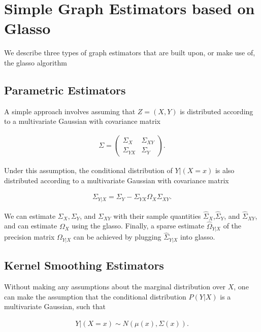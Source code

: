 \documentclass[12pt]{article}
\begin{document}
\section{Simple Graph Estimators based on Glasso}
\label{simpleEstimators}

We describe three types of graph estimators that are built upon, or
make use of, the glasso algorithm

\subsection{Parametric Estimators}

A simple approach involves assuming that $Z = (X,Y)$ is distributed
according to a multivariate Gaussian with covariance matrix

\begin{align}
    \Sigma = \left( \begin{matrix} \Sigma_X& \Sigma_{XY} \\ \Sigma_{YX} & \Sigma_Y \end{matrix} \right).
\end{align}

Under this assumption, the conditional distribution of $Y|(X=x)$ is
also distributed according to a multivariate Gaussian with covariance
matrix

\begin{align}
    \Sigma_{Y|X} = \Sigma_Y - \Sigma_{YX}\Omega_X\Sigma_{XY}.
\end{align}

We can estimate $\Sigma_X,\Sigma_Y$, and $\Sigma_{XY}$ with their
sample quantities $\hat{\Sigma}_X$,$\hat{\Sigma}_Y$, and
$\hat{\Sigma}_{XY}$, and can estimate $\Omega_X$ using the
glasso. Finally, a sparse estimate $\hat{\Omega}_{Y|X}$ of the
precision matrix $\Omega_{Y|X}$ can be achieved by plugging
$\hat{\Sigma}_{Y|X}$ into glasso.

\subsection{Kernel Smoothing Estimators}

Without making any assumptions about the marginal distribution over
$X$, one can make the assumption that the conditional distribution
$P(Y|X)$ is a multivariate Gaussian, such that

\begin{align}
    Y|(X=x) \sim N(\mu(x),\Sigma(x)).
\end{align}
\end{document}
